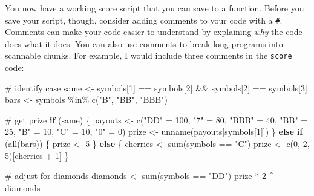 \documentclass[
  letterpaper,
  DIV=11,
  numbers=noendperiod]{scrbook}
\newenvironment{Shaded}{\begin{snugshade}}{\end{snugshade}}
\newcommand{\CommentTok}[1]{\textcolor[rgb]{0.37,0.37,0.37}{#1}}
\newcommand{\ControlFlowTok}[1]{\textcolor[rgb]{0.00,0.23,0.31}{\textbf{#1}}}
\newcommand{\DecValTok}[1]{\textcolor[rgb]{0.68,0.00,0.00}{#1}}
\newcommand{\FunctionTok}[1]{\textcolor[rgb]{0.28,0.35,0.67}{#1}}
\newcommand{\NormalTok}[1]{\textcolor[rgb]{0.00,0.23,0.31}{#1}}
\newcommand{\OtherTok}[1]{\textcolor[rgb]{0.00,0.23,0.31}{#1}}
\newcommand{\SpecialCharTok}[1]{\textcolor[rgb]{0.37,0.37,0.37}{#1}}
\newcommand{\StringTok}[1]{\textcolor[rgb]{0.13,0.47,0.30}{#1}}
\begin{document}
You now have a working score script that you can save to a function.
Before you save your script, though, consider adding comments to your
code with a \texttt{\#}. Comments can make your code easier to
understand by explaining \emph{why} the code does what it does. You can
also use comments to break long programs into scannable chunks. For
example, I would include three comments in the \texttt{score} code:

\begin{Shaded}
\begin{Highlighting}[]
\CommentTok{\# identify case}
\NormalTok{same }\OtherTok{\textless{}{-}}\NormalTok{ symbols[}\DecValTok{1}\NormalTok{] }\SpecialCharTok{==}\NormalTok{ symbols[}\DecValTok{2}\NormalTok{] }\SpecialCharTok{\&\&}\NormalTok{ symbols[}\DecValTok{2}\NormalTok{] }\SpecialCharTok{==}\NormalTok{ symbols[}\DecValTok{3}\NormalTok{]}
\NormalTok{bars }\OtherTok{\textless{}{-}}\NormalTok{ symbols }\SpecialCharTok{\%in\%} \FunctionTok{c}\NormalTok{(}\StringTok{"B"}\NormalTok{, }\StringTok{"BB"}\NormalTok{, }\StringTok{"BBB"}\NormalTok{)}

\CommentTok{\# get prize}
\ControlFlowTok{if}\NormalTok{ (same) \{}
\NormalTok{  payouts }\OtherTok{\textless{}{-}} \FunctionTok{c}\NormalTok{(}\StringTok{"DD"} \OtherTok{=} \DecValTok{100}\NormalTok{, }\StringTok{"7"} \OtherTok{=} \DecValTok{80}\NormalTok{, }\StringTok{"BBB"} \OtherTok{=} \DecValTok{40}\NormalTok{, }\StringTok{"BB"} \OtherTok{=} \DecValTok{25}\NormalTok{, }
    \StringTok{"B"} \OtherTok{=} \DecValTok{10}\NormalTok{, }\StringTok{"C"} \OtherTok{=} \DecValTok{10}\NormalTok{, }\StringTok{"0"} \OtherTok{=} \DecValTok{0}\NormalTok{)}
\NormalTok{  prize }\OtherTok{\textless{}{-}} \FunctionTok{unname}\NormalTok{(payouts[symbols[}\DecValTok{1}\NormalTok{]])}
\NormalTok{\} }\ControlFlowTok{else} \ControlFlowTok{if}\NormalTok{ (}\FunctionTok{all}\NormalTok{(bars)) \{}
\NormalTok{  prize }\OtherTok{\textless{}{-}} \DecValTok{5}
\NormalTok{\} }\ControlFlowTok{else}\NormalTok{ \{}
\NormalTok{  cherries }\OtherTok{\textless{}{-}} \FunctionTok{sum}\NormalTok{(symbols }\SpecialCharTok{==} \StringTok{"C"}\NormalTok{)}
\NormalTok{  prize }\OtherTok{\textless{}{-}} \FunctionTok{c}\NormalTok{(}\DecValTok{0}\NormalTok{, }\DecValTok{2}\NormalTok{, }\DecValTok{5}\NormalTok{)[cherries }\SpecialCharTok{+} \DecValTok{1}\NormalTok{]}
\NormalTok{\}}

\CommentTok{\# adjust for diamonds}
\NormalTok{diamonds }\OtherTok{\textless{}{-}} \FunctionTok{sum}\NormalTok{(symbols }\SpecialCharTok{==} \StringTok{"DD"}\NormalTok{)}
\NormalTok{prize }\SpecialCharTok{*} \DecValTok{2} \SpecialCharTok{\^{}}\NormalTok{ diamonds}
\end{Highlighting}
\end{Shaded}
\end{document}
